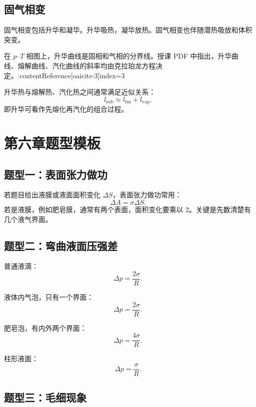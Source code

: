 \subsection{固气相变}

固气相变包括升华和凝华。升华吸热，凝华放热。固气相变也伴随潜热吸放和体积突变。

在 \(p\)--\(T\) 相图上，升华曲线是固相和气相的分界线。授课 PDF 中指出，升华曲线、熔解曲线、汽化曲线的斜率均由克拉珀龙方程决定。:contentReference[oaicite:3]{index=3}

升华热与熔解热、汽化热之间通常满足近似关系：
\[
  \boxed{
  l_{\mathrm{sub}}
  \approx
  l_{\mathrm{fus}}+l_{\mathrm{vap}}
  }.
\]
即升华可看作先熔化再汽化的组合过程。

\section{第六章题型模板}

\subsection{题型一：表面张力做功}

\begin{MethodBox}[表面积变化题]
若题目给出液膜或液面面积变化 \(\Delta S\)，表面张力做功常用：
\[
  \Delta A=\sigma\Delta S.
\]
若是液膜，例如肥皂膜，通常有两个表面，面积变化要乘以 \(2\)。关键是先数清楚有几个液气界面。
\end{MethodBox}

\subsection{题型二：弯曲液面压强差}

\begin{MethodBox}[液滴、气泡、肥皂泡]
\begin{ReviewList}
  \item 普通液滴：
  \[
    \Delta p=\frac{2\sigma}{R}.
  \]
  \item 液体内气泡，只有一个界面：
  \[
    \Delta p=\frac{2\sigma}{R}.
  \]
  \item 肥皂泡，有内外两个界面：
  \[
    \Delta p=\frac{4\sigma}{R}.
  \]
  \item 柱形液面：
  \[
    \Delta p=\frac{\sigma}{R}.
  \]
\end{ReviewList}
\end{MethodBox}

\subsection{题型三：毛细现象}


